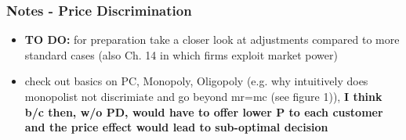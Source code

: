 \documentclass[10pt]{beamer}
\begin{document}
\begin{frame} 
	\frametitle{Notes - Price Discrimination}
	
	\begin{itemize}
	\item \textbf{TO DO:} for preparation take a closer look at adjustments compared to more standard cases (also Ch. 14 in which firms exploit market power)
	\item check out basics on PC, Monopoly, Oligopoly	(e.g. why intuitively does monopolist not discrimiate and go beyond mr=mc (see figure 1)), \textbf{I think b/c then, w/o PD, would have to offer lower P to each customer and the price effect would lead to sub-optimal decision}

		
	\end{itemize}
	
	
\end{frame}
\end{document}
